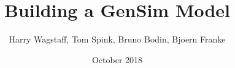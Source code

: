 \documentclass{beamer}
\title %
{Building a GenSim Model}
\author %
{Harry Wagstaff, Tom Spink, Bruno Bodin, Bjoern Franke}
\institute %
{
	Institute for Computing Systems Architecture \\
	University of Edinburgh
}
\date %
{October 2018}
\begin{document}
	
\begin{frame}
  \titlepage
\end{frame}

	
	












\end{document}
